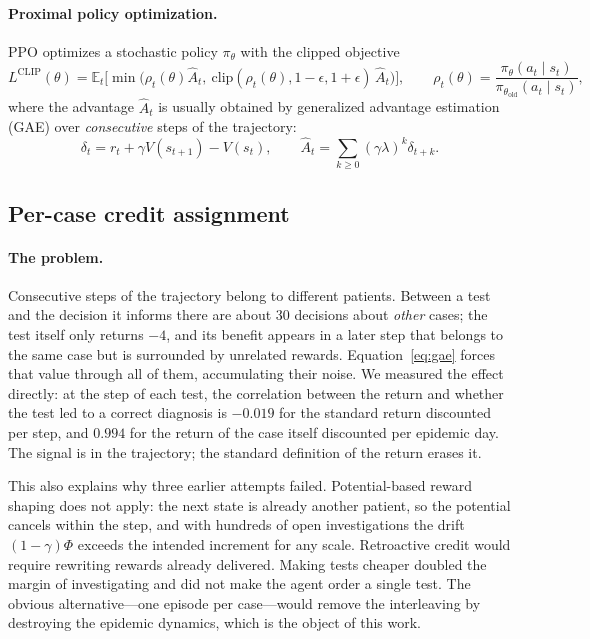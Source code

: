 \documentclass[11pt,a4paper]{article}
\begin{document}
\paragraph{Proximal policy optimization.} PPO \cite{schulman2017ppo} optimizes a stochastic policy $\pi_\theta$ with the clipped objective
\begin{equation}
L^{\text{CLIP}}(\theta) = \mathbb{E}_t \big[ \min\big( \rho_t(\theta) \hat A_t,\ \text{clip}(\rho_t(\theta), 1-\epsilon, 1+\epsilon)\, \hat A_t \big) \big],
\qquad \rho_t(\theta) = \frac{\pi_\theta(a_t \mid s_t)}{\pi_{\theta_{\text{old}}}(a_t \mid s_t)},
\end{equation}
where the advantage $\hat A_t$ is usually obtained by generalized advantage estimation (GAE) \cite{schulman2016gae} over \emph{consecutive} steps of the trajectory:
\begin{equation}
\delta_t = r_t + \gamma V(s_{t+1}) - V(s_t), \qquad \hat A_t = \sum_{k \ge 0} (\gamma\lambda)^k \delta_{t+k}.
\label{eq:gae}
\end{equation}

\subsection{Per-case credit assignment}
\label{sec:credit}

\paragraph{The problem.} Consecutive steps of the trajectory belong to different patients. Between a test and the decision it informs there are about 30 decisions about \emph{other} cases; the test itself only returns $-4$, and its benefit appears in a later step that belongs to the same case but is surrounded by unrelated rewards. Equation~\eqref{eq:gae} forces that value through all of them, accumulating their noise. We measured the effect directly: at the step of each test, the correlation between the return and whether the test led to a correct diagnosis is $-0.019$ for the standard return discounted per step, and $0.994$ for the return of the case itself discounted per epidemic day. The signal is in the trajectory; the standard definition of the return erases it.

This also explains why three earlier attempts failed. Potential-based reward shaping \cite{ng1999policy} does not apply: the next state is already another patient, so the potential cancels within the step, and with hundreds of open investigations the drift $(1-\gamma)\Phi$ exceeds the intended increment for any scale. Retroactive credit would require rewriting rewards already delivered. Making tests cheaper doubled the margin of investigating and did not make the agent order a single test. The obvious alternative---one episode per case---would remove the interleaving by destroying the epidemic dynamics, which is the object of this work.
\end{document}
